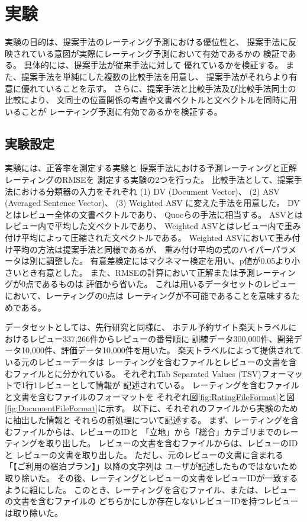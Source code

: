 \section{実験} \label{sec:Experiments}

実験の目的は、提案手法のレーティング予測における優位性と、
提案手法に反映されている意図が実際にレーティング予測において有効であるかの
検証である。
具体的には、提案手法が従来手法\cite{fujitani15}に対して
優れているかを検証する。
また、提案手法を単純にした複数の比較手法を用意し、
提案手法がそれらより有意に優れていることを示す。
さらに、提案手法と比較手法及び比較手法同士の比較により、
文同士の位置関係の考慮や文書ベクトルと文ベクトルを同時に用いることが
レーティング予測に有効であるかを検証する。


\subsection{実験設定}

実験には、正答率を測定する実験と
提案手法における予測レーティングと正解レーティングのRMSEを
測定する実験の2つを行った。
比較手法として、提案手法における分類器の入力をそれぞれ
(1) DV (Document Vector)、
(2) ASV (Averaged Sentence Vector)、
(3) Weighted ASV
に変えた手法を用意した。
DVとはレビュー全体の文書ベクトルであり、
Quocら\cite{quoc14}の手法に相当する。
ASVとはレビュー内で平均した文ベクトルであり、
Weighted ASVとはレビュー内で重み付け平均によって圧縮された文ベクトルである。
Weighted ASVにおいて重み付け平均の方法は提案手法と同様であるが、
重み付け平均の式のハイパーパラメータは別に調整した。
有意差検定にはマクネマー検定を用い、p値が0.05より小さいとき有意とした。
また、RMSEの計算において正解または予測レーティングが0点であるものは
評価から省いた。
これは用いるデータセットのレビューにおいて、レーティングの0点は
レーティングが不可能であることを意味するためである。

データセットとしては、先行研究\cite{fujitani15}と同様に、
ホテル予約サイト楽天トラベルにおけるレビュー337,266件からレビューの番号順に
訓練データ300,000件、開発データ10,000件、評価データ10,000件を用いた。
楽天トラベルによって提供されている元のレビューデータは
レーティングを含むファイルとレビューの文書を含むファイルとに分かれている。
それぞれTab Separated Values (TSV)フォーマットで1行1レビューとして情報が
記述されている。
レーティングを含むファイルと文書を含むファイルのフォーマットを
それぞれ図\ref{fig:RatingFileFormat}と図\ref{fig:DocumentFileFormat}に示す。
以下に、それぞれのファイルから実験のために抽出した情報と
それらの前処理について記述する。
まず、レーティングを含むファイルからは、レビューのIDと
「立地」から「総合」カテゴリまでのレーティングを取り出した。
レビューの文書を含むファイルからは、レビューのIDと
レビューの文書を取り出した。
ただし、元のレビューの文書に含まれる「【ご利用の宿泊プラン】」以降の文字列は
ユーザが記述したものではないため取り除いた。
その後、レーティングとレビューの文書をレビューIDが一致するように組にした。
このとき、レーティングを含むファイル、または、レビューの文書を含むファイルの
どちらかにしか存在しないレビューIDを持つレビューは取り除いた。

